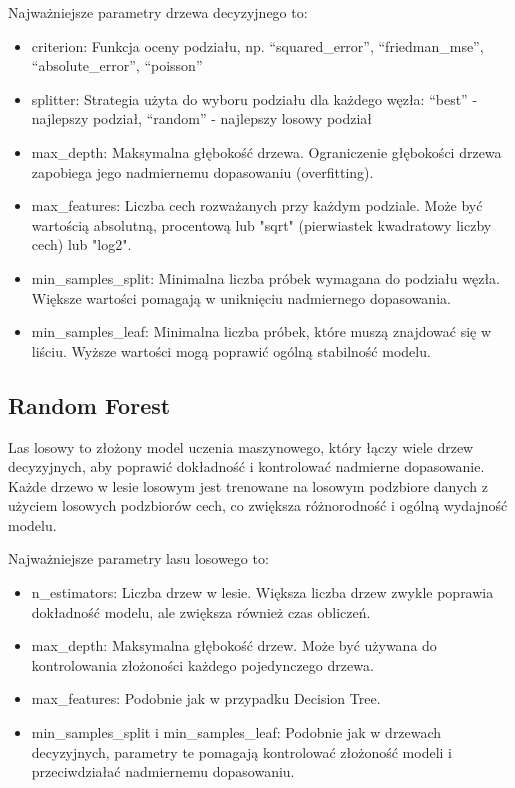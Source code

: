 \documentclass{article}
\begin{document}
Najważniejsze parametry drzewa decyzyjnego to:
\begin{itemize}
    \item criterion: Funkcja oceny podziału, np. “squared\_error”, “friedman\_mse”, “absolute\_error”, “poisson”
    \item splitter: Strategia użyta do wyboru podziału dla każdego węzła: “best” - najlepszy podział, “random” - najlepszy losowy podział
    \item max\_depth: Maksymalna głębokość drzewa. Ograniczenie głębokości drzewa zapobiega jego nadmiernemu dopasowaniu (overfitting).
    \item max\_features: Liczba cech rozważanych przy każdym podziale. Może być wartością absolutną, procentową lub "sqrt" (pierwiastek kwadratowy liczby cech) lub "log2".
    \item min\_samples\_split: Minimalna liczba próbek wymagana do podziału węzła. Większe wartości pomagają w uniknięciu nadmiernego dopasowania.
    \item min\_samples\_leaf: Minimalna liczba próbek, które muszą znajdować się w liściu. Wyższe wartości mogą poprawić ogólną stabilność modelu.
\end{itemize}

\subsection{Random Forest}
Las losowy \cite{random_forest} to złożony model uczenia maszynowego, który łączy wiele drzew decyzyjnych, aby poprawić dokładność i kontrolować nadmierne dopasowanie. Każde drzewo w lesie losowym jest trenowane na losowym podzbiore danych z użyciem losowych podzbiorów cech, co zwiększa różnorodność i ogólną wydajność modelu.

Najważniejsze parametry lasu losowego to:
\begin{itemize}
    \item n\_estimators: Liczba drzew w lesie. Większa liczba drzew zwykle poprawia dokładność modelu, ale zwiększa również czas obliczeń.
    \item max\_depth: Maksymalna głębokość drzew. Może być używana do kontrolowania złożoności każdego pojedynczego drzewa.
    \item max\_features: Podobnie jak w przypadku Decision Tree.
    \item min\_samples\_split i min\_samples\_leaf: Podobnie jak w drzewach decyzyjnych, parametry te pomagają kontrolować złożoność modeli i przeciwdziałać nadmiernemu dopasowaniu.
\end{itemize}
\end{document}
